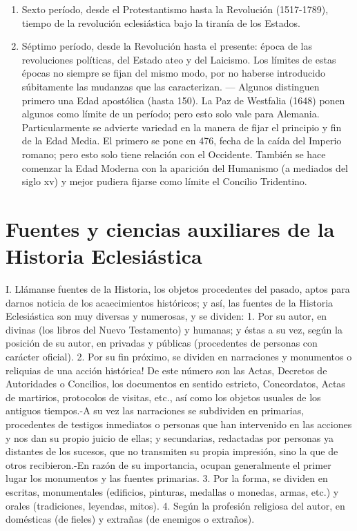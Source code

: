 \raggedbottom{} \documentclass[12pt, a4paper]{book}
\begin{document}
\begin{enumerate}
\begin{enumerate}
    \item Sexto período, desde el Protestantismo hasta la Revolución (1517-1789), tiempo de la revolución eclesiástica bajo la tiranía de los Estados.
    \item Séptimo período, desde la Revolución hasta el presente: época de las revoluciones políticas, del Estado ateo y del Laicismo. Los límites de estas épocas no siempre se fijan del mismo modo, por no haberse introducido súbitamente las mudanzas que las caracterizan. --- Algunos distinguen primero una Edad apostólica (hasta 150). La Paz de Westfalia (1648) ponen algunos como límite de un período; pero esto solo vale para Alemania. Particularmente se advierte variedad en la manera de fijar el principio y fin de la Edad Media. El primero se pone en 476, fecha de la caída del Imperio romano; pero esto solo tiene relación con el Occidente. También se hace comenzar la Edad Moderna con la aparición del Humanismo (a mediados del siglo xv) y mejor pudiera fijarse como límite el Concilio Tridentino.
  \end{enumerate}

\end{enumerate}
\section{Fuentes y ciencias auxiliares de la Historia Eclesiástica}
I. Llámanse fuentes de la Historia, los objetos procedentes del
pasado, aptos para darnos noticia de los acaecimientos históricos; y
así, las fuentes de la Historia Eclesiástica son muy diversas y numerosas, y se dividen: 1. Por su autor, en divinas (los libros del Nuevo
Testamento) y humanas; y éstas a su vez, según la posición de su
autor, en privadas y públicas (procedentes de personas con carácter
oficial). 2. Por su fin próximo, se dividen en narraciones y monumentos o reliquias de una acción histórica! De este número son las Actas,
Decretos de Autoridades o Concilios, los documentos en sentido estricto, Concordatos, Actas de martirios, protocolos de visitas, etc.,
así como los objetos usuales de los antiguos tiempos.-A su vez las
narraciones se subdividen en primarias, procedentes de testigos inmediatos o personas que han intervenido en las acciones y nos dan su
propio juicio de ellas; y secundarias, redactadas por personas ya distantes de los sucesos, que no transmiten su propia impresión, sino la
que de otros recibieron.-En razón de su importancia, ocupan generalmente el primer lugar los monumentos y las fuentes primarias.
3. Por la forma, se dividen en escritas, monumentales (edificios, pinturas, medallas o monedas, armas, etc.) y orales (tradiciones, leyendas, mitos). 4. Según la profesión religiosa del autor, en domésticas
(de fieles) y extrañas (de enemigos o extraños).
\end{document}
